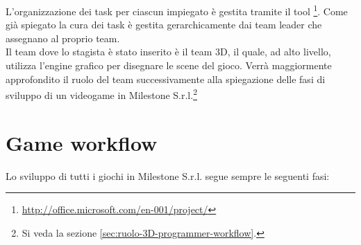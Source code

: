 L'organizzazione dei task per ciascun impiegato è gestita tramite il tool \footnote{\url{http://office.microsoft.com/en-001/project/}}. Come già spiegato la cura dei task è gestita gerarchicamente dai team leader che assegnano al proprio team.\\


Il team dove lo stagista è stato inserito è il team 3D, il quale, ad alto livello, utilizza l'engine grafico per disegnare le scene del gioco. Verrà maggiormente approfondito il ruolo del team successivamente alla spiegazione delle fasi di sviluppo di un videogame in Milestone S.r.l.\footnote{Si veda la sezione \ref{sec:ruolo-3D-programmer-workflow}.}

\section{Game workflow}

Lo sviluppo di tutti i giochi in Milestone S.r.l. segue sempre le seguenti fasi:

